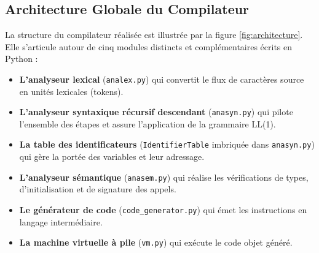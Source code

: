 \documentclass[a4paper, 12pt]{article}
\begin{document}
\subsection{Architecture Globale du Compilateur}
La structure du compilateur réalisée est illustrée par la figure \ref{fig:architecture}. Elle s'articule autour de cinq modules distincts et complémentaires écrits en Python :
\begin{itemize}
    \item \textbf{L'analyseur lexical} (\texttt{analex.py}) qui convertit le flux de caractères source en unités lexicales (tokens).
    \item \textbf{L'analyseur syntaxique récursif descendant} (\texttt{anasyn.py}) qui pilote l'ensemble des étapes et assure l'application de la grammaire LL(1).
    \item \textbf{La table des identificateurs} (\texttt{IdentifierTable} imbriquée dans \texttt{anasyn.py}) qui gère la portée des variables et leur adressage.
    \item \textbf{L'analyseur sémantique} (\texttt{anasem.py}) qui réalise les vérifications de types, d'initialisation et de signature des appels.
    \item \textbf{Le générateur de code} (\texttt{code\_generator.py}) qui émet les instructions en langage intermédiaire.
    \item \textbf{La machine virtuelle à pile} (\texttt{vm.py}) qui exécute le code objet généré.
\end{itemize}
\end{document}
